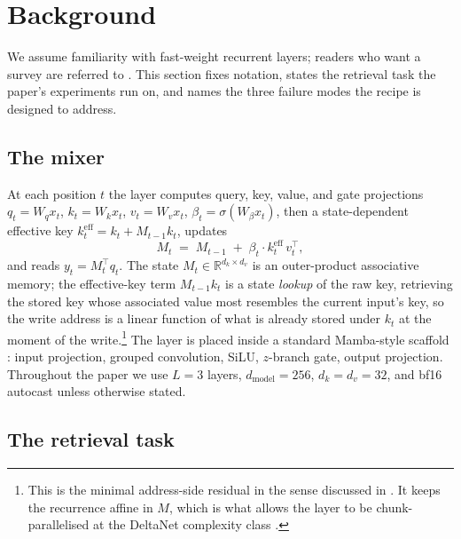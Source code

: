 \documentclass[11pt]{article}
\begin{document}
\section{Background}
\label{sec:background}

We assume familiarity with fast-weight recurrent layers; readers
who want a survey are referred to
\citet{schlag2021linear,yang2024deltanet,irie2022srwm}. This section
fixes notation, states the retrieval task the paper's experiments
run on, and names the three failure modes the recipe is designed to
address.

\subsection{The mixer}

At each position $t$ the layer computes query, key, value, and
gate projections
$q_t = W_q x_t$, $k_t = W_k x_t$, $v_t = W_v x_t$,
$\beta_t = \sigma(W_\beta x_t)$, then a state-dependent effective
key $k^{\mathrm{eff}}_t = k_t + M_{t-1} k_t$, updates
\begin{equation}
  M_t \;=\; M_{t-1} \;+\; \beta_t \cdot k^{\mathrm{eff}}_t \, v_t^\top,
  \label{eq:write}
\end{equation}
and reads $y_t = M_t^\top q_t$. The state
$M_t \in \mathbb{R}^{d_k \times d_v}$
is an outer-product associative memory; the effective-key term
$M_{t-1} k_t$ is a state \emph{lookup} of the raw key, retrieving
the stored key whose associated value most resembles the current
input's key, so the write address is a linear function of what is
already stored under $k_t$ at the moment of the write.\footnote{This is the minimal
address-side residual in the sense discussed in
\citet{irie2022srwm,irie2021going}. It keeps the recurrence affine in
$M$, which is what allows the layer to be chunk-parallelised at the
DeltaNet complexity class \citep{yang2024deltanet}.} The layer is
placed inside a standard Mamba-style scaffold
\citep{gu2024mamba,dao2024mamba2}: input projection, grouped
convolution, SiLU, $z$-branch gate, output projection. Throughout the
paper we use $L=3$ layers, $d_{\mathrm{model}} = 256$,
$d_k = d_v = 32$, and bf16 autocast unless otherwise stated.

\subsection{The retrieval task}
\end{document}

